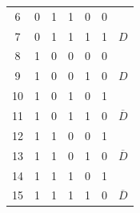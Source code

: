 \begin{center}
\begin{tabular}{ccccccc}
\multicolumn{1}{c|}{6}                           & 0                         & 1                         & 1                         & \multicolumn{1}{c|}{0}                         & \multicolumn{1}{c|}{0}                             &                                  \\
\multicolumn{1}{c|}{7}                           & 0                         & 1                         & 1                         & \multicolumn{1}{c|}{1}                         & \multicolumn{1}{c|}{1}                             & \multirow{-2}{*}{$D$}            \\ \hline
\multicolumn{1}{c|}{8}                           & 1                         & 0                         & 0                         & \multicolumn{1}{c|}{0}                         & \multicolumn{1}{c|}{0}                             &                                  \\
\multicolumn{1}{c|}{9}                           & 1                         & 0                         & 0                         & \multicolumn{1}{c|}{1}                         & \multicolumn{1}{c|}{0}                             & \multirow{-2}{*}{$D$}            \\ \hline
\multicolumn{1}{c|}{10}                          & 1                         & 0                         & 1                         & \multicolumn{1}{c|}{0}                         & \multicolumn{1}{c|}{1}                             &                                  \\
\multicolumn{1}{c|}{11}                          & 1                         & 0                         & 1                         & \multicolumn{1}{c|}{1}                         & \multicolumn{1}{c|}{0}                             & \multirow{-2}{*}{$\overline{D}$} \\ \hline
\multicolumn{1}{c|}{12}                          & 1                         & 1                         & 0                         & \multicolumn{1}{c|}{0}                         & \multicolumn{1}{c|}{1}                             &                                  \\
\multicolumn{1}{c|}{13}                          & 1                         & 1                         & 0                         & \multicolumn{1}{c|}{1}                         & \multicolumn{1}{c|}{0}                             & \multirow{-2}{*}{$\overline{D}$} \\ \hline
\multicolumn{1}{c|}{14}                          & 1                         & 1                         & 1                         & \multicolumn{1}{c|}{0}                         & \multicolumn{1}{c|}{1}                             &                                  \\
\multicolumn{1}{c|}{15}                          & 1                         & 1                         & 1                         & \multicolumn{1}{c|}{1}                         & \multicolumn{1}{c|}{0}                             & \multirow{-2}{*}{$\overline{D}$}           
\end{tabular}
\end{center}

